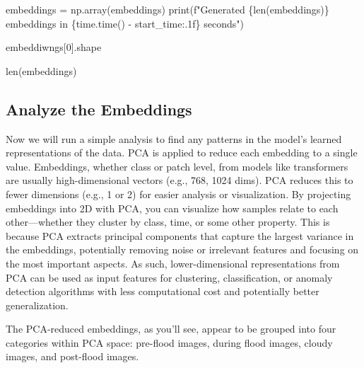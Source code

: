 \documentclass[
  letterpaper,
  DIV=11,
  numbers=noendperiod]{scrreprt}
\newenvironment{Shaded}{\begin{snugshade}}{\end{snugshade}}
\newcommand{\BuiltInTok}[1]{\textcolor[rgb]{0.00,0.23,0.31}{#1}}
\newcommand{\DecValTok}[1]{\textcolor[rgb]{0.68,0.00,0.00}{#1}}
\newcommand{\NormalTok}[1]{\textcolor[rgb]{0.00,0.23,0.31}{#1}}
\newcommand{\OperatorTok}[1]{\textcolor[rgb]{0.37,0.37,0.37}{#1}}
\newcommand{\SpecialCharTok}[1]{\textcolor[rgb]{0.37,0.37,0.37}{#1}}
\newcommand{\SpecialStringTok}[1]{\textcolor[rgb]{0.13,0.47,0.30}{#1}}
\begin{document}
\begin{Shaded}
\begin{Highlighting}[]
\NormalTok{embeddings }\OperatorTok{=}\NormalTok{ np.array(embeddings)}
\BuiltInTok{print}\NormalTok{(}\SpecialStringTok{f"Generated }\SpecialCharTok{\{}\BuiltInTok{len}\NormalTok{(embeddings)}\SpecialCharTok{\}}\SpecialStringTok{ embeddings in }\SpecialCharTok{\{}\NormalTok{time}\SpecialCharTok{.}\NormalTok{time() }\OperatorTok{{-}}\NormalTok{ start\_time}\SpecialCharTok{:.1f\}}\SpecialStringTok{ seconds"}\NormalTok{)}
\end{Highlighting}
\end{Shaded}

\begin{Shaded}
\begin{Highlighting}[]
\NormalTok{embeddiwngs[}\DecValTok{0}\NormalTok{].shape}
\end{Highlighting}
\end{Shaded}

\begin{Shaded}
\begin{Highlighting}[]
\BuiltInTok{len}\NormalTok{(embeddings)}
\end{Highlighting}
\end{Shaded}

\subsection{Analyze the Embeddings}\label{analyze-the-embeddings}

Now we will run a simple analysis to find any patterns in the model's
learned representations of the data. PCA is applied to reduce each
embedding to a single value. Embeddings, whether class or patch level,
from models like transformers are usually high-dimensional vectors
(e.g., 768, 1024 dims). PCA reduces this to fewer dimensions (e.g., 1 or
2) for easier analysis or visualization. By projecting embeddings into
2D with PCA, you can visualize how samples relate to each
other---whether they cluster by class, time, or some other property.
This is because PCA extracts principal components that capture the
largest variance in the embeddings, potentially removing noise or
irrelevant features and focusing on the most important aspects. As such,
lower-dimensional representations from PCA can be used as input features
for clustering, classification, or anomaly detection algorithms with
less computational cost and potentially better generalization.

The PCA-reduced embeddings, as you'll see, appear to be grouped into
four categories within PCA space: pre-flood images, during flood images,
cloudy images, and post-flood images.
\end{document}

